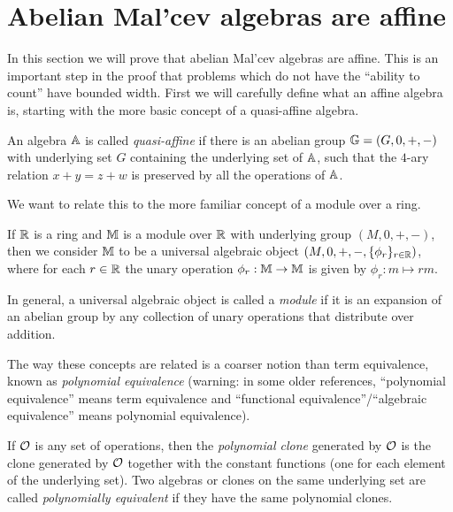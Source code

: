 \documentclass[letterpaper,11pt]{article}
\begin{document}
\section{Abelian Mal'cev algebras are affine}\label{s-abelian-malcev}

In this section we will prove that abelian Mal'cev algebras are affine. This is an important step in the proof that problems which do not have the ``ability to count'' have bounded width. First we will carefully define what an affine algebra is, starting with the more basic concept of a quasi-affine algebra.

\begin{defn} An algebra $\mathbb{A}$ is called \emph{quasi-affine} if there is an abelian group $\mathbb{G} = (G,0,+,-)$ with underlying set $G$ containing the underlying set of $\mathbb{A}$, such that the $4$-ary relation $x+y = z+w$ is preserved by all the operations of $\mathbb{A}$.
\end{defn}

We want to relate this to the more familiar concept of a module over a ring.

\begin{defn} If $\mathbb{R}$ is a ring and $\mathbb{M}$ is a module over $\mathbb{R}$ with underlying group $(M,0,+,-)$, then we consider $\mathbb{M}$ to be a universal algebraic object $(M,0,+,-,\{\phi_r\}_{r \in \mathbb{R}})$, where for each $r\in\mathbb{R}$ the unary operation $\phi_r : \mathbb{M} \rightarrow \mathbb{M}$ is given by $\phi_r : m \mapsto rm$.

In general, a universal algebraic object is called a \emph{module} if it is an expansion of an abelian group by any collection of unary operations that distribute over addition.
\end{defn}

The way these concepts are related is a coarser notion than term equivalence, known as \emph{polynomial equivalence} (warning: in some older references, ``polynomial equivalence'' means term equivalence and ``functional equivalence''/``algebraic equivalence'' means polynomial equivalence).

\begin{defn} If $\mathcal{O}$ is any set of operations, then the \emph{polynomial clone} generated by $\mathcal{O}$ is the clone generated by $\mathcal{O}$ together with the constant functions (one for each element of the underlying set). Two algebras or clones on the same underlying set are called \emph{polynomially equivalent} if they have the same polynomial clones.
\end{defn}
\end{document}
